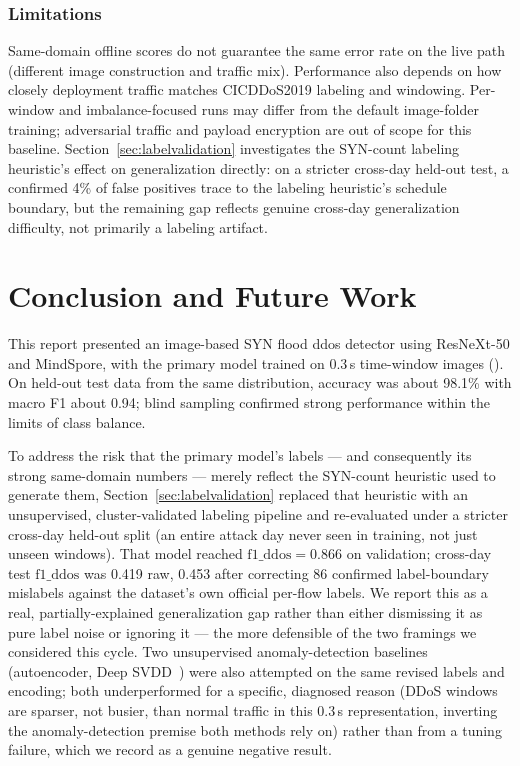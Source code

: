 \subsection{Limitations}
Same-domain offline scores do not guarantee the same error rate on the live
path (different image construction and traffic mix). Performance also depends on how closely
deployment traffic matches CICDDoS2019 labeling and windowing.
Per-window and imbalance-focused runs may differ from the default image-folder
training; adversarial traffic and payload encryption are out of scope for this
baseline. Section~\ref{sec:labelvalidation} investigates the SYN-count
labeling heuristic's effect on generalization directly: on a stricter
cross-day held-out test, a confirmed 4\% of false positives trace to the
labeling heuristic's schedule boundary, but the remaining gap reflects
genuine cross-day generalization difficulty, not primarily a labeling
artifact.


\chapter{Conclusion and Future Work}
\label{ch:conc}

This report presented an image-based SYN flood \gls{ddos} detector using
ResNeXt-50 and MindSpore, with the primary model trained on 0.3\,s time-window
images (). On held-out test data from the
same distribution, accuracy was about 98.1\% with macro F1 about 0.94; blind
sampling confirmed strong performance within the limits of class balance.

To address the risk that the primary model's labels --- and consequently its
strong same-domain numbers --- merely reflect the SYN-count heuristic used to
generate them, Section~\ref{sec:labelvalidation} replaced that heuristic with
an unsupervised, cluster-validated labeling pipeline and re-evaluated under a
stricter cross-day held-out split (an entire attack day never seen in
training, not just unseen windows). That model reached
$\mathrm{f1\_ddos}=0.866$ on validation; cross-day test $\mathrm{f1\_ddos}$
was 0.419 raw, 0.453 after correcting 86 confirmed label-boundary mislabels
against the dataset's own official per-flow labels. We report this as a
real, partially-explained generalization gap rather than either dismissing
it as pure label noise or ignoring it --- the more defensible of the two
framings we considered this cycle. Two unsupervised anomaly-detection
baselines (autoencoder, Deep SVDD~\cite{ruff2018deep}) were also attempted on
the same revised labels and encoding; both underperformed for a specific,
diagnosed reason (DDoS windows are sparser, not busier, than normal traffic
in this 0.3\,s representation, inverting the anomaly-detection premise both
methods rely on) rather than from a tuning failure, which we record as a
genuine negative result.

